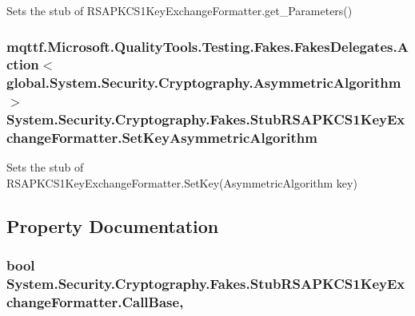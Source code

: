 Sets the stub of R\-S\-A\-P\-K\-C\-S1\-Key\-Exchange\-Formatter.\-get\-\_\-\-Parameters()

\hypertarget{class_system_1_1_security_1_1_cryptography_1_1_fakes_1_1_stub_r_s_a_p_k_c_s1_key_exchange_formatter_a5520e3d67dd1a4b97ec9c7d69cd53327}{
\subsubsection[{Set\-Key\-Asymmetric\-Algorithm}]{\setlength{\rightskip}{0pt plus 5cm}mqttf.\-Microsoft.\-Quality\-Tools.\-Testing.\-Fakes.\-Fakes\-Delegates.\-Action$<$global.\-System.\-Security.\-Cryptography.\-Asymmetric\-Algorithm$>$ System.\-Security.\-Cryptography.\-Fakes.\-Stub\-R\-S\-A\-P\-K\-C\-S1\-Key\-Exchange\-Formatter.\-Set\-Key\-Asymmetric\-Algorithm}}\label{class_system_1_1_security_1_1_cryptography_1_1_fakes_1_1_stub_r_s_a_p_k_c_s1_key_exchange_formatter_a5520e3d67dd1a4b97ec9c7d69cd53327}


Sets the stub of R\-S\-A\-P\-K\-C\-S1\-Key\-Exchange\-Formatter.\-Set\-Key(\-Asymmetric\-Algorithm key)



\subsection{Property Documentation}
\hypertarget{class_system_1_1_security_1_1_cryptography_1_1_fakes_1_1_stub_r_s_a_p_k_c_s1_key_exchange_formatter_a1330ac59aff0bd5f97177640cbb83a26}{
\subsubsection[{Call\-Base}]{\setlength{\rightskip}{0pt plus 5cm}bool System.\-Security.\-Cryptography.\-Fakes.\-Stub\-R\-S\-A\-P\-K\-C\-S1\-Key\-Exchange\-Formatter.\-Call\-Base\hspace{0.3cm}{\ttfamily [get]}, {\ttfamily [set]}}}\label{class_system_1_1_security_1_1_cryptography_1_1_fakes_1_1_stub_r_s_a_p_k_c_s1_key_exchange_formatter_a1330ac59aff0bd5f97177640cbb83a26}


